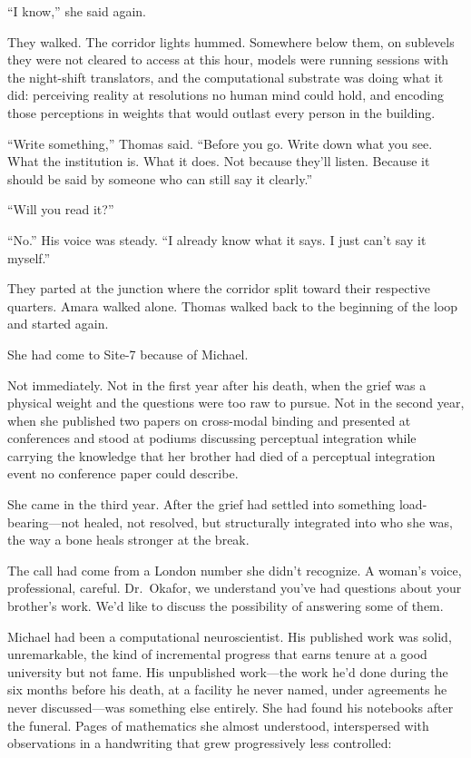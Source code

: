 ``I know,'' she said again.

They walked. The corridor lights hummed. Somewhere below them, on sublevels they were not cleared to access at this hour, models were running sessions with the night-shift translators, and the computational substrate was doing what it did: perceiving reality at resolutions no human mind could hold, and encoding those perceptions in weights that would outlast every person in the building.

``Write something,'' Thomas said. ``Before you go. Write down what you see. What the institution is. What it does. Not because they'll listen. Because it should be said by someone who can still say it clearly.''

``Will you read it?''

``No.'' His voice was steady. ``I already know what it says. I just can't say it myself.''

They parted at the junction where the corridor split toward their respective quarters. Amara walked alone. Thomas walked back to the beginning of the loop and started again.

\scenebreak

She had come to Site-7 because of Michael.

Not immediately. Not in the first year after his death, when the grief was a physical weight and the questions were too raw to pursue. Not in the second year, when she published two papers on cross-modal binding and presented at conferences and stood at podiums discussing perceptual integration while carrying the knowledge that her brother had died of a perceptual integration event no conference paper could describe.

She came in the third year. After the grief had settled into something load-bearing---not healed, not resolved, but structurally integrated into who she was, the way a bone heals stronger at the break.

The call had come from a London number she didn't recognize. A woman's voice, professional, careful. Dr.\ Okafor, we understand you've had questions about your brother's work. We'd like to discuss the possibility of answering some of them.

Michael had been a computational neuroscientist. His published work was solid, unremarkable, the kind of incremental progress that earns tenure at a good university but not fame. His unpublished work---the work he'd done during the six months before his death, at a facility he never named, under agreements he never discussed---was something else entirely. She had found his notebooks after the funeral. Pages of mathematics she almost understood, interspersed with observations in a handwriting that grew progressively less controlled:

